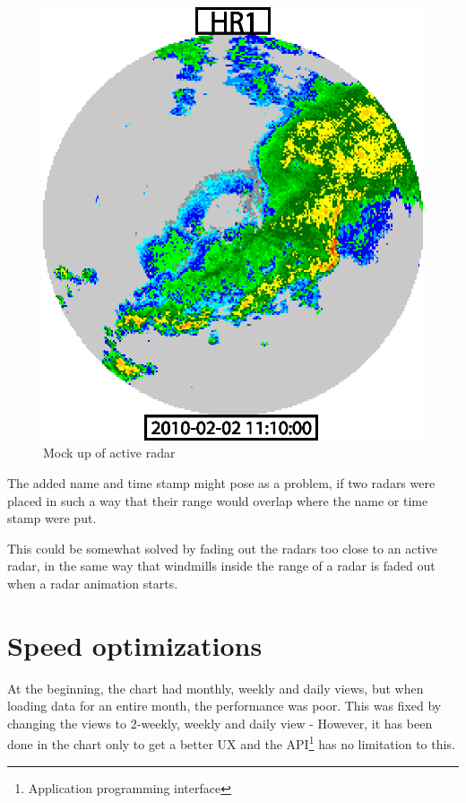 \begin{figure}[htbp]
\begin{minipage}[b]{0.5\linewidth}
    \includegraphics[width=\linewidth]{figure/radar2.eps}
    \caption{Mock up of active radar}
    \label{fig:mock_up_active_radar}
  \end{minipage}
\end{figure}
The added name and time stamp might pose as a problem, if two radars were placed in such a way that their range would overlap where the name or time stamp were put.

This could be somewhat solved by fading out the radars too close to an active radar, in the same way that windmills inside the range of a radar is faded out when a radar animation starts.

\section{Speed optimizations}
\label{sec:speed_optimization}
At the beginning, the chart had monthly, weekly and daily views, but when loading data for an entire month, the performance was poor. This was fixed by changing the views to 2-weekly, weekly and daily view - However, it has been done in the chart only to get a better UX and the API\footnote{Application programming interface} has no limitation to this.

